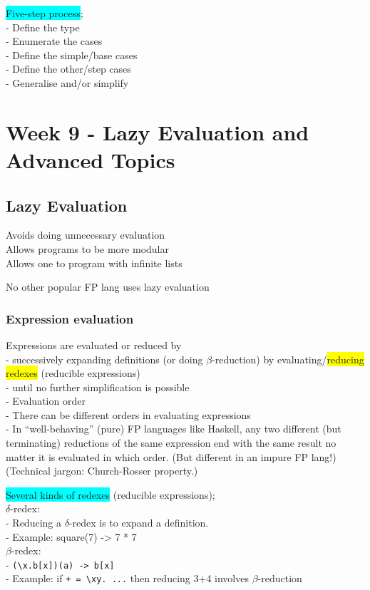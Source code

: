 \documentclass[tikz,border=10pt]{project_plan}
\begin{document}
\colorbox{cyan}{Five-step process};\\
- Define the type\\
- Enumerate the cases\\
- Define the simple/base cases\\
- Define the other/step cases\\
- Generalise and/or simplify


\chapter{Week 9 - Lazy Evaluation and Advanced Topics}

\section{Lazy Evaluation}

Avoids doing unnecessary evaluation\\
Allows programs to be more modular\\
Allows one to program with infinite lists

No other popular FP lang uses lazy evaluation

\subsection{Expression evaluation}

Expressions are evaluated or reduced by\\
- successively expanding definitions (or doing $\beta$-reduction) by
evaluating/\colorbox{yellow}{reducing redexes} (reducible expressions)\\
- until no further simplification is possible\\
- Evaluation order\\
- There can be different orders in evaluating expressions\\
- In “well-behaving” (pure) FP languages like Haskell, any two
different (but terminating) reductions of the same expression end
with the same result no matter it is evaluated in which order. (But
different in an impure FP lang!)\\
(Technical jargon: Church-Rosser property.)

\colorbox{cyan}{Several kinds of redexes} (reducible expressions);\\
$\delta$-redex:\\
- Reducing a $\delta$-redex is to expand a definition.\\
- Example: square(7) -> 7 * 7\\
$\beta$-redex:\\
- \lstinline?(\x.b[x])(a) -> b[x]?\\
- Example: if \lstinline?+ = \xy. ...? then reducing 3+4 involves $\beta$-reduction
\end{document}

